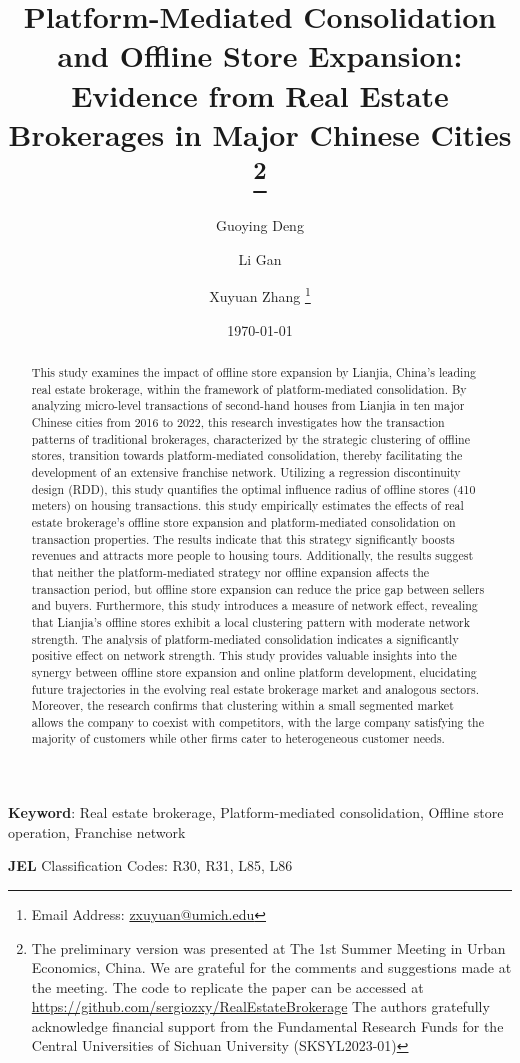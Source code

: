\documentclass[11pt]{article}
\title{ \vspace*{-2.5cm} \hspace*{-0.5cm}Platform-Mediated Consolidation and Offline Store Expansion: Evidence from Real Estate Brokerages in Major Chinese Cities \footnote{
The preliminary version was presented at The 1st Summer Meeting in Urban Economics, China. We are grateful for the comments and suggestions made at the meeting. The code to replicate the paper can be accessed at \href{https://github.com/sergiozxy/RealEstateBrokerage}{https://github.com/sergiozxy/RealEstateBrokerage} The authors gratefully acknowledge financial support from the Fundamental Research Funds for the Central Universities of Sichuan University (SKSYL2023-01)%
}}
\date{ \vspace*{0.5cm} \today}
\begin{document}
\author[1]{Guoying Deng} %
\author[2,3]{Li Gan} %
\author[4]{Xuyuan Zhang \thanks{Email Address: \href{mailto:zxuyuan@umich.edu}{zxuyuan@umich.edu}}}

\bgroup
\let\footnoterule\relax

\begin{singlespace}
\maketitle

\begin{abstract}
    \noindent This study examines the impact of offline store expansion by Lianjia, China's leading real estate brokerage, within the framework of platform-mediated consolidation. By analyzing micro-level transactions of second-hand houses from Lianjia in ten major Chinese cities from 2016 to 2022, this research investigates how the transaction patterns of traditional brokerages, characterized by the strategic clustering of offline stores, transition towards platform-mediated consolidation, thereby facilitating the development of an extensive franchise network. Utilizing a regression discontinuity design (RDD), this study quantifies the optimal influence radius of offline stores (410 meters) on housing transactions. this study empirically estimates the effects of real estate brokerage's offline store expansion and platform-mediated consolidation on transaction properties. The results indicate that this strategy significantly boosts revenues and attracts more people to housing tours. Additionally, the results suggest that neither the platform-mediated strategy nor offline expansion affects the transaction period, but offline store expansion can reduce the price gap between sellers and buyers. Furthermore, this study introduces a measure of network effect, revealing that Lianjia's offline stores exhibit a local clustering pattern with moderate network strength. The analysis of platform-mediated consolidation indicates a significantly positive effect on network strength. This study provides valuable insights into the synergy between offline store expansion and online platform development, elucidating future trajectories in the evolving real estate brokerage market and analogous sectors. Moreover, the research confirms that clustering within a small segmented market allows the company to coexist with competitors, with the large company satisfying the majority of customers while other firms cater to heterogeneous customer needs.
  \end{abstract}
  
  \textbf{Keyword}: Real estate brokerage, Platform-mediated consolidation, Offline store operation, Franchise network
  
  \textbf{JEL} Classification Codes: R30, R31, L85, L86
\end{singlespace}
\end{document}
